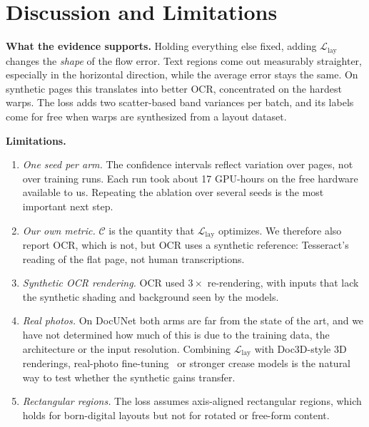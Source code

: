 \documentclass[a4paper,fleqn]{cas-sc}
\newcommand{\Llay}{\mathcal{L}_{\mathrm{lay}}}
\newcommand{\Cm}{\mathcal{C}}
\begin{document}
\section{Discussion and Limitations}
\label{sec:limits}
\textbf{What the evidence supports.} Holding everything else fixed, adding $\Llay$ changes the \emph{shape} of the flow error. Text regions come out measurably straighter, especially in the horizontal direction, while the average error stays the same. On synthetic pages this translates into better OCR, concentrated on the hardest warps. The loss adds two scatter-based band variances per batch, and its labels come for free when warps are synthesized from a layout dataset.

\textbf{Limitations.}
\begin{enumerate}
\item \emph{One seed per arm.} The confidence intervals reflect variation over pages, not over training runs. Each run took about 17 GPU-hours on the free hardware available to us. Repeating the ablation over several seeds is the most important next step.
\item \emph{Our own metric.} $\Cm$ is the quantity that $\Llay$ optimizes. We therefore also report OCR, which is not, but OCR uses a synthetic reference: Tesseract's reading of the flat page, not human transcriptions.
\item \emph{Synthetic OCR rendering.} OCR used $3\times$ re-rendering, with inputs that lack the synthetic shading and background seen by the models.
\item \emph{Real photos.} On DocUNet both arms are far from the state of the art, and we have not determined how much of this is due to the training data, the architecture or the input resolution. Combining $\Llay$ with Doc3D-style 3D renderings, real-photo fine-tuning~\cite{ma2022paperedge} or stronger crease models is the natural way to test whether the synthetic gains transfer.
\item \emph{Rectangular regions.} The loss assumes axis-aligned rectangular regions, which holds for born-digital layouts but not for rotated or free-form content.
\end{enumerate}

\end{document}
